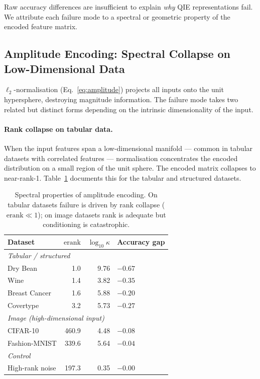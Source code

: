 \documentclass[12pt]{article}
\newcommand{\erank}{\mathrm{erank}}
\begin{document}
Raw accuracy differences are insufficient to explain \emph{why} QIE
representations fail.
We attribute each failure mode to a spectral or geometric property of the
encoded feature matrix.

\subsection{Amplitude Encoding: Spectral Collapse on Low-Dimensional Data}
\label{sec:amplitude}

$\ell_2$-normalisation (Eq.~\ref{eq:amplitude}) projects all inputs onto the
unit hypersphere, destroying magnitude information.
The failure mode takes two related but distinct forms depending on the
intrinsic dimensionality of the input.

\paragraph{Rank collapse on tabular data.}
When the input features span a low-dimensional manifold --- common in tabular
datasets with correlated features --- normalisation concentrates the encoded
distribution on a small region of the unit sphere.
The encoded matrix collapses to near-rank-1.
Table~\ref{tab:spectral_amplitude} documents this for the tabular and
structured datasets.

\begin{table}[tbp]
\centering
\caption{Spectral properties of amplitude encoding.  On tabular datasets
failure is driven by rank collapse ($\erank \ll 1$); on image datasets rank
is adequate but conditioning is catastrophic.}
\label{tab:spectral_amplitude}
\small
\begin{tabular}{lrrl}
\toprule
Dataset & $\erank$ & $\log_{10}\kappa$ & Accuracy gap \\
\midrule
\multicolumn{4}{l}{\textit{Tabular / structured}} \\
Dry Bean        &     1.0 &  9.76 & $-0.67$ \\
Wine            &     1.4 &  3.82 & $-0.35$ \\
Breast Cancer   &     1.6 &  5.88 & $-0.20$ \\
Covertype       &     3.2 &  5.73 & $-0.27$ \\
\midrule
\multicolumn{4}{l}{\textit{Image (high-dimensional input)}} \\
CIFAR-10        &   460.9 &  4.48 & $-0.08$ \\
Fashion-MNIST   &   339.6 &  5.64 & $-0.04$ \\
\midrule
\multicolumn{4}{l}{\textit{Control}} \\
High-rank noise & 197.3   &  0.35 & $-0.00$ \\
\bottomrule
\end{tabular}
\end{table}
\end{document}
